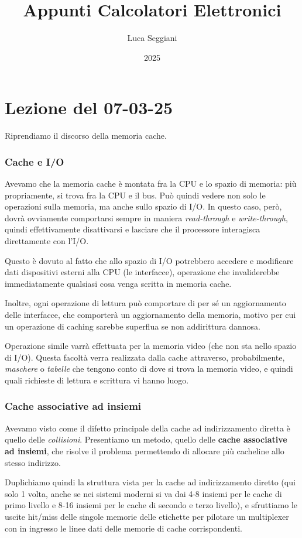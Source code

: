 \documentclass[a4paper,11pt]{article}
\title{Appunti Calcolatori Elettronici}
\author{Luca Seggiani}
\date{2025}
\begin{document}
\section{Lezione del 07-03-25}

\thispagestyle{empty}
\pagestyle{fancy}

Riprendiamo il discorso della memoria cache.

\subsubsection{Cache e I/O}
Avevamo che la memoria cache è montata fra la CPU e lo spazio di memoria: più propriamente, si trova fra la CPU e il bus.
Può quindi vedere non solo le operazioni sulla memoria, ma anche sullo spazio di I/O.
In questo caso, però, dovrà ovviamente comportarsi sempre in maniera \textit{read-through} e \textit{write-through}, quindi effettivamente disattivarsi e lasciare che il processore interagisca direttamente con l'I/O.

Questo è dovuto al fatto che allo spazio di I/O potrebbero accedere e modificare dati dispositivi esterni alla CPU (le interfacce), operazione che invaliderebbe immediatamente qualsiasi cosa venga scritta in memoria cache.

Inoltre, ogni operazione di lettura può comportare di per sé un aggiornamento delle interfacce, che comporterà un aggiornamento della memoria, motivo per cui un operazione di caching sarebbe superflua se non addirittura dannosa.

Operazione simile varrà effettuata per la memoria video (che non sta nello spazio di I/O).
Questa facoltà verra realizzata dalla cache attraverso, probabilmente, \textit{maschere} o \textit{tabelle} che tengono conto di dove si trova la memoria video, e quindi quali richieste di lettura e scrittura vi hanno luogo.

\subsubsection{Cache associative ad insiemi}
Avevamo visto come il difetto principale della cache ad indirizzamento diretta è quello delle \textit{collisioni}.
Presentiamo un metodo, quello delle \textbf{cache associative ad insiemi}, che risolve il problema permettendo di allocare più cacheline allo stesso indirizzo.

Duplichiamo quindi la struttura vista per la cache ad indirizzamento diretto (qui solo 1 volta, anche se nei sistemi moderni si va dai 4-8 insiemi per le cache di primo livello e 8-16 insiemi per le cache di secondo e terzo livello), e sfruttiamo le uscite hit/miss delle singole memorie delle etichette per pilotare un multiplexer con in ingresso le linee dati delle memorie di cache corrispondenti.
\end{document}
